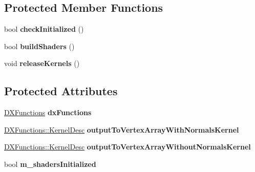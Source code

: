 \subsection*{Protected Member Functions}
\begin{DoxyCompactItemize}
\item 
\hypertarget{classbt_soft_body_solver_output_d_xto_d_x_afc40e9e297ae6decfcad0a043c2c3fd3}{bool {\bfseries check\+Initialized} ()}\label{classbt_soft_body_solver_output_d_xto_d_x_afc40e9e297ae6decfcad0a043c2c3fd3}

\item 
\hypertarget{classbt_soft_body_solver_output_d_xto_d_x_af0390dad6650ea973dfb8e483ead99c5}{bool {\bfseries build\+Shaders} ()}\label{classbt_soft_body_solver_output_d_xto_d_x_af0390dad6650ea973dfb8e483ead99c5}

\item 
\hypertarget{classbt_soft_body_solver_output_d_xto_d_x_a8a9239e3b28ca3521b54808be7101939}{void {\bfseries release\+Kernels} ()}\label{classbt_soft_body_solver_output_d_xto_d_x_a8a9239e3b28ca3521b54808be7101939}

\end{DoxyCompactItemize}
\subsection*{Protected Attributes}
\begin{DoxyCompactItemize}
\item 
\hypertarget{classbt_soft_body_solver_output_d_xto_d_x_a0e59a313f5c216a89c7db0e7a6e00bc9}{\hyperlink{class_d_x_functions}{D\+X\+Functions} {\bfseries dx\+Functions}}\label{classbt_soft_body_solver_output_d_xto_d_x_a0e59a313f5c216a89c7db0e7a6e00bc9}

\item 
\hypertarget{classbt_soft_body_solver_output_d_xto_d_x_a520eda8045f9dd00760b53a651553a2d}{\hyperlink{class_d_x_functions_1_1_kernel_desc}{D\+X\+Functions\+::\+Kernel\+Desc} {\bfseries output\+To\+Vertex\+Array\+With\+Normals\+Kernel}}\label{classbt_soft_body_solver_output_d_xto_d_x_a520eda8045f9dd00760b53a651553a2d}

\item 
\hypertarget{classbt_soft_body_solver_output_d_xto_d_x_a9eb099f1e0c4a54ab08481126473d73a}{\hyperlink{class_d_x_functions_1_1_kernel_desc}{D\+X\+Functions\+::\+Kernel\+Desc} {\bfseries output\+To\+Vertex\+Array\+Without\+Normals\+Kernel}}\label{classbt_soft_body_solver_output_d_xto_d_x_a9eb099f1e0c4a54ab08481126473d73a}

\item 
\hypertarget{classbt_soft_body_solver_output_d_xto_d_x_a9fa048c485cdd386bab4eb32ac50ba7f}{bool {\bfseries m\+\_\+shaders\+Initialized}}\label{classbt_soft_body_solver_output_d_xto_d_x_a9fa048c485cdd386bab4eb32ac50ba7f}

\end{DoxyCompactItemize}


